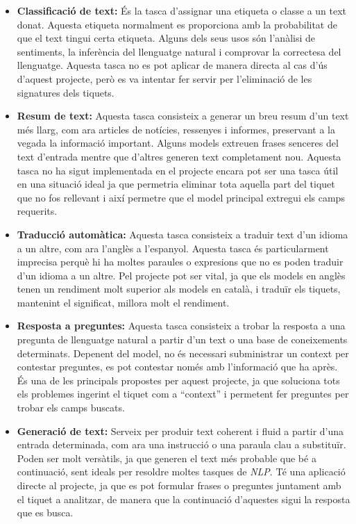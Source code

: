 \begin{itemize}
    \item \textbf{Classificació de text:} És la tasca d'assignar una etiqueta o classe a un text donat. Aquesta etiqueta normalment es proporciona amb la probabilitat de que el text tingui certa etiqueta. Alguns dels seus usos són l'anàlisi de sentiments, la inferència del llenguatge natural i comprovar la correctesa del llenguatge. Aquesta tasca no es pot aplicar de manera directa al cas d'ús d'aquest projecte, però es va intentar fer servir per l'eliminació de les signatures dels tiquets.
    \item \textbf{Resum de text:} Aquesta tasca consisteix a generar un breu resum d'un text més llarg, com ara articles de notícies, ressenyes i informes, preservant a la vegada la informació important. Alguns models extreuen frases senceres del text d'entrada mentre que d'altres generen text completament nou. Aquesta tasca no ha sigut implementada en el projecte encara pot ser una tasca útil en una situació ideal ja que permetria eliminar tota aquella part del tiquet que no fos rellevant i així permetre que el model principal extregui els camps requerits.
    \item \textbf{Traducció automàtica:} Aquesta tasca consisteix a traduir text d'un idioma a un altre, com ara l'anglès a l'espanyol. Aquesta tasca és particularment imprecisa perquè hi ha moltes paraules o expresions que no es poden traduir d'un idioma a un altre. Pel projecte pot ser vital, ja que els models en anglès tenen un rendiment molt superior als models en català, i traduïr els tiquets, mantenint el significat, millora molt el rendiment.
    \item \textbf{Resposta a preguntes:} Aquesta tasca consisteix a trobar la resposta a una pregunta de llenguatge natural a partir d'un text o una base de coneixements determinats. Depenent del model, no és necessari subministrar un context per contestar preguntes, es pot contestar només amb l'informació que ha après. És una de les principals propostes per aquest projecte, ja que soluciona tots els problemes ingerint el tiquet com a ``context'' i permetent fer preguntes per trobar els camps buscats.
    \item \textbf{Generació de text:} Serveix per produir text coherent i fluid a partir d'una entrada determinada, com ara una instrucció o una paraula clau a substituïr. Poden ser molt versàtils, ja que generen el text més probable que bé a continuació, sent ideals per resoldre moltes tasques de \textit{NLP}. Té una aplicació directe al projecte, ja que es pot formular frases o preguntes juntament amb el tiquet a analitzar, de manera que la continuació d'aquestes sigui la resposta que es busca.

\end{itemize}
